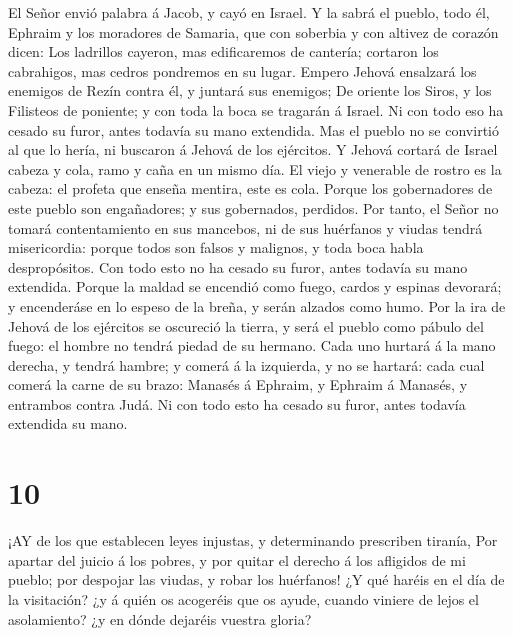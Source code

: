  El Señor envió palabra á Jacob, y cayó en Israel.
 Y la sabrá el pueblo, todo él, Ephraim y los moradores de
Samaria, que con soberbia y con altivez de corazón dicen: 
Los ladrillos cayeron, mas edificaremos de cantería; cortaron los
cabrahigos, mas cedros pondremos en su lugar.  Empero
Jehová ensalzará los enemigos de Rezín contra él, y juntará sus
enemigos;  De oriente los Siros, y los Filisteos de
poniente; y con toda la boca se tragarán á Israel. Ni con todo eso ha
cesado su furor, antes todavía su mano extendida.  Mas el
pueblo no se convirtió al que lo hería, ni buscaron á Jehová de los
ejércitos.  Y Jehová cortará de Israel cabeza y cola, ramo
y caña en un mismo día.  El viejo y venerable de rostro es
la cabeza: el profeta que enseña mentira, este es cola. 
Porque los gobernadores de este pueblo son engañadores; y sus
gobernados, perdidos.  Por tanto, el Señor no tomará
contentamiento en sus mancebos, ni de sus huérfanos y viudas tendrá
misericordia: porque todos son falsos y malignos, y toda boca habla
despropósitos. Con todo esto no ha cesado su furor, antes todavía su
mano extendida.  Porque la maldad se encendió como fuego,
cardos y espinas devorará; y encenderáse en lo espeso de la breña, y
serán alzados como humo.  Por la ira de Jehová de los
ejércitos se oscureció la tierra, y será el pueblo como pábulo del
fuego: el hombre no tendrá piedad de su hermano.  Cada uno
hurtará á la mano derecha, y tendrá hambre; y comerá á la izquierda, y
no se hartará: cada cual comerá la carne de su brazo: 
Manasés á Ephraim, y Ephraim á Manasés, y entrambos contra Judá. Ni con
todo esto ha cesado su furor, antes todavía extendida su mano.

\hypertarget{section-9}{%
\section{10}\label{section-9}}

 ¡AY de los que establecen leyes injustas, y determinando
prescriben tiranía,  Por apartar del juicio á los pobres, y
por quitar el derecho á los afligidos de mi pueblo; por despojar las
viudas, y robar los huérfanos!  ¿Y qué haréis en el día de
la visitación? ¿y á quién os acogeréis que os ayude, cuando viniere de
lejos el asolamiento? ¿y en dónde dejaréis vuestra gloria?

